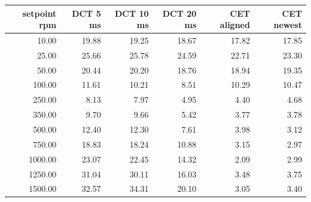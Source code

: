 \begin{tabular}{@{}rrrrrr@{}}
\toprule
setpoint rpm & DCT 5 ms & DCT 10 ms & DCT 20 ms & CET aligned & CET newest \\
\midrule
10.00 & 19.88 & 19.25 & 18.67 & 17.82 & 17.85 \\
25.00 & 25.66 & 25.78 & 24.59 & 22.71 & 23.30 \\
50.00 & 20.44 & 20.20 & 18.76 & 18.94 & 19.35 \\
100.00 & 11.61 & 10.21 & 8.51 & 10.29 & 10.47 \\
250.00 & 8.13 & 7.97 & 4.95 & 4.40 & 4.68 \\
350.00 & 9.70 & 9.66 & 5.42 & 3.77 & 3.78 \\
500.00 & 12.40 & 12.30 & 7.61 & 3.98 & 3.12 \\
750.00 & 18.83 & 18.24 & 10.88 & 3.15 & 2.97 \\
1000.00 & 23.07 & 22.45 & 14.32 & 2.09 & 2.99 \\
1250.00 & 31.04 & 30.11 & 16.03 & 3.48 & 3.75 \\
1500.00 & 32.57 & 34.31 & 20.10 & 3.05 & 3.40 \\
\bottomrule
\end{tabular}
